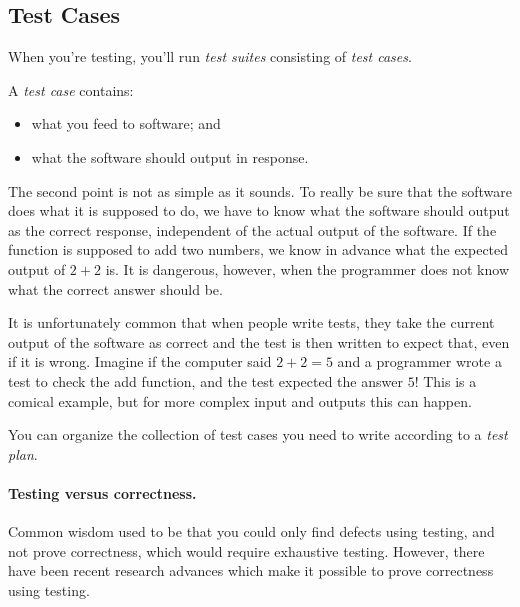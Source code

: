 \subsection*{Test Cases}

When you're
testing, you'll run \emph{test suites} consisting of \emph{test
  cases}.

A \emph{test case} contains:
\begin{itemize}
\item what you feed to software; and
\item what the software should output in response.  
\end{itemize} 

The second point is not as simple as it sounds. To really be sure that the software does what it is supposed to do, we have to know what the software should output as the correct response, independent of the actual output of the software. If the function is supposed to add two numbers, we know in advance what the expected output of $2 + 2$ is. It is dangerous, however, when the programmer does not know what the correct answer should be.

It is unfortunately common that when people write tests, they take the current output of the software as correct and the test is then written to expect that, even if it is wrong. Imagine if the computer said $2 + 2 = 5$ and a programmer wrote a test to check the add function, and the test expected the answer $5$! This is a comical example, but for more complex input and outputs this can happen.

You can organize the collection of test cases you need to write
according to a \emph{test plan}.

\paragraph{Testing versus correctness.} Common wisdom used to be
that you could only find defects using testing, and not prove
correctness, which would require exhaustive testing. However,
there have been recent research advances which make it possible
to prove correctness using testing.


